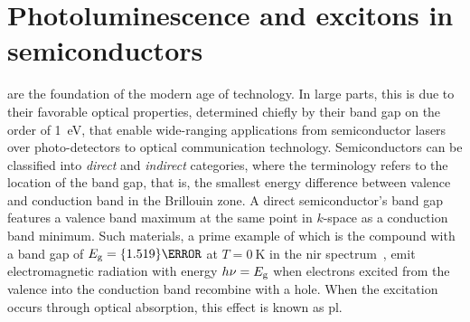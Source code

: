 \chapter{Photoluminescence and excitons in semiconductors}\label{ch:exp:theory}
 are the foundation of the modern age of technology.
In large parts, this is due to their favorable optical properties, determined chiefly by their band gap on the order of \qty{1}{\electronvolt}, that enable wide-ranging applications from semiconductor lasers over photo-detectors to optical communication technology.
Semiconductors can be classified into \emph{direct} and \emph{indirect} categories, where the terminology refers to the location of the band gap, that is, the smallest energy difference between valence and conduction band in the Brillouin zone.
A direct semiconductor's band gap features a valence band maximum at the same point in $k$-space as a conduction band minimum.
Such materials, a prime example of which is the compound  with a band gap of $E_{\mr{g}}=\qty{1.519}{\electronvolt}$ at $T=\qty{0}{\kelvin}$ in the \gls{nir} spectrum~\cite{Vurgaftman2001}, emit electromagnetic radiation with energy $h\nu = E_{\mathrm{g}}$ when electrons excited from the valence into the conduction band recombine with a hole.
When the excitation occurs through optical absorption, this effect is known as \acrlong{pl}.

